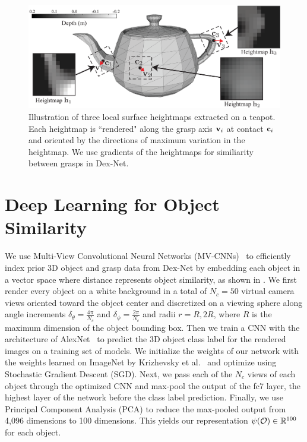 \begin{figure}[t!]
\centering
\includegraphics[scale=0.30]{figures/illustrations/local_feature_model.eps}
\caption{Illustration of three local surface heightmaps extracted on a teapot. Each heightmap is ``rendered" along the grasp axis $\mathbf{v}_i$ at contact $\mathbf{c}_i$ and oriented by the directions of maximum variation in the heightmap.  We use gradients of the heightmaps for similiarity between grasps in Dex-Net.}
\vspace*{-15pt}
\end{figure}

\section{Deep Learning for Object Similarity}
We use Multi-View Convolutional Neural Networks (MV-CNNs)~\cite{aubry2015understanding, su2015multi} to efficiently index prior 3D object and grasp data from Dex-Net by embedding each object in a vector space where distance represents object similarity, as shown in .
We first render every object on a white background in a total of $N_c = 50$ virtual camera views oriented toward the object center and discretized on a viewing sphere along angle increments $\delta_{\theta} = \frac{4 \pi}{N_c}$ and $\delta_{\phi} = \frac{2 \pi}{N_c}$ and radii $r = R, 2R$, where $R$ is the maximum dimension of the object bounding box.
Then we train a CNN with the architecture of AlexNet~\cite{krizhevsky2012imagenet} to predict the 3D object class label for the rendered images on a training set of models. 
We initialize the weights of our network with the weights learned on ImageNet by Krizhevsky et al.~\cite{krizhevsky2012imagenet} and optimize using Stochastic Gradient Descent (SGD). 
Next, we pass each of the $N_c$ views of each object through the optimized CNN and max-pool the output of the fc7 layer, the highest layer of the network before the class label prediction. 
Finally, we use Principal Component Analysis (PCA) to reduce the max-pooled output from 4,096 dimensions to 100 dimensions.
This yields our representation $\psi(\mathcal{O}) \in \mathbb{R}^{100}$ for each object.

